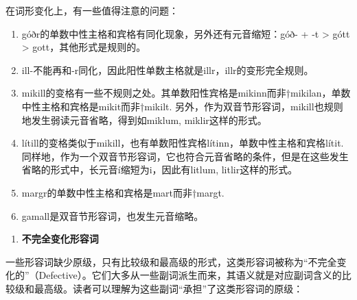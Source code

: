 在词形变化上，有一些值得注意的问题：

\begin{enumerate}
  \def\labelenumi{\alph{enumi})}
  \item
        góðr的单数中性主格和宾格有同化现象，另外还有元音缩短：góð- + -t
        \textgreater{} gótt \textgreater{} gott，其他形式是规则的。
  \item
        ill-不能再和-r同化，因此阳性单数主格就是illr，illr的变形完全规则。
  \item
        mikill的变格有一些不规则之处。其单数阳性宾格是mikinn而非†mikilan，单数中性主格和宾格是mikit而非†mikilt.
        另外，作为双音节形容词，mikill也规则地发生弱读元音省略，得到如miklum,
        miklir这样的形式。
  \item
        lítill的变格类似于mikill，也有单数阳性宾格lítinn，单数中性主格和宾格lítit.
        同样地，作为一个双音节形容词，它也符合元音省略的条件，但是在这些发生省略的形式中，长元音í缩短为i，因此有litlum,
        litlir这样的形式。
  \item
        margr的单数中性主格和宾格是mart而非†margt.
  \item
        gamall是双音节形容词，也发生元音缩略。
\end{enumerate}

\begin{enumerate}
  \def\labelenumi{\arabic{enumi})}
  \setcounter{enumi}{2}
  \item
        \textbf{不完全变化形容词}
\end{enumerate}

一些形容词缺少原级，只有比较级和最高级的形式，这类形容词被称为``不完全变化的''（Defective）。它们大多从一些副词派生而来，其语义就是对应副词含义的比较级和最高级。读者可以理解为这些副词``承担''了这类形容词的原级：

